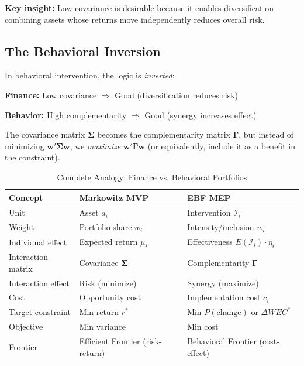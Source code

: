 \textbf{Key insight:} Low covariance is desirable because it enables diversification---
combining assets whose returns move independently reduces overall risk.

\subsection{The Behavioral Inversion}

In behavioral intervention, the logic is \textit{inverted}:

\begin{tcolorbox}[colback=yellow!5!white, colframe=yellow!75!black,
    title=The Key Inversion]

\textbf{Finance:} Low covariance $\Rightarrow$ Good (diversification reduces risk)

\textbf{Behavior:} High complementarity $\Rightarrow$ Good (synergy increases effect)

\vspace{0.5em}
The covariance matrix $\boldsymbol{\Sigma}$ becomes the complementarity matrix
$\boldsymbol{\Gamma}$, but instead of minimizing $\mathbf{w}'\boldsymbol{\Sigma}\mathbf{w}$,
we \textit{maximize} $\mathbf{w}'\boldsymbol{\Gamma}\mathbf{w}$ (or equivalently,
include it as a benefit in the constraint).
\end{tcolorbox}

\begin{table}[htbp]
\centering
\caption{Complete Analogy: Finance vs. Behavioral Portfolios}
\label{tab:analogy}
\renewcommand{\arraystretch}{1.4}
\begin{tabular}{@{}lll@{}}
\toprule
\textbf{Concept} & \textbf{Markowitz MVP} & \textbf{EBF MEP} \\
\midrule
Unit & Asset $a_i$ & Intervention $\mathcal{I}_i$ \\
Weight & Portfolio share $w_i$ & Intensity/inclusion $w_i$ \\
Individual effect & Expected return $\mu_i$ & Effectiveness $E(\mathcal{I}_i) \cdot \eta_i$ \\
Interaction matrix & Covariance $\boldsymbol{\Sigma}$ & Complementarity $\boldsymbol{\Gamma}$ \\
Interaction effect & Risk (minimize) & Synergy (maximize) \\
Cost & Opportunity cost & Implementation cost $c_i$ \\
Target constraint & Min return $r^*$ & Min $P(\text{change})$ or $\Delta WEC^*$ \\
Objective & Min variance & Min cost \\
Frontier & Efficient Frontier (risk-return) & Behavioral Frontier (cost-effect) \\
\bottomrule
\end{tabular}
\end{table}


